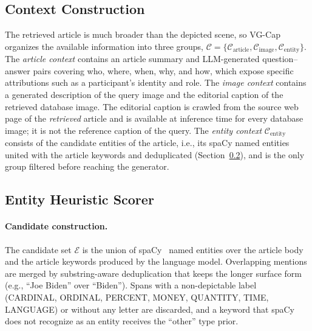 \documentclass[runningheads]{llncs}
\DeclareRobustCommand{\aciids}[1]{{\color{olive}#1}}
\DeclareRobustCommand{\revise}[1]{{\color{olive}#1}}
\DeclareRobustCommand{\aciids}[1]{#1}
\DeclareRobustCommand{\revise}[1]{#1}
\begin{document}
\subsection{Context Construction}
\label{sec:context}

The retrieved article is much broader than the depicted scene, so VG-Cap organizes the available information into three groups, $\mathcal{C}=\{\mathcal{C}_{\mathrm{article}},\mathcal{C}_{\mathrm{image}},\mathcal{C}_{\mathrm{entity}}\}$. The \emph{article context} contains an article summary and LLM-generated question--answer pairs \aciids{covering who, where, when, why, and how}, which expose specific attributions such as a participant's identity and role. The \emph{image context} contains a \aciids{generated} description of the query image and the editorial caption of the retrieved database image. \revise{The editorial caption is crawled from the source web page of the \emph{retrieved} article and is available at inference time for every database image; it is not the reference caption of the query.} The \emph{entity context} $\mathcal{C}_{\mathrm{entity}}$ consists of \aciids{the candidate entities of the article, i.e., its spaCy named entities united with the article keywords and deduplicated (Section~\ref{sec:entity_scorer}),} and is the only group filtered before reaching the generator.

\subsection{Entity Heuristic Scorer}
\label{sec:entity_scorer}

\paragraph{Candidate construction.}
The candidate set $\mathcal{E}$ is the union of spaCy~\cite{honnibal2020spacy} named entities over the article body and \aciids{the article keywords} produced by the language model. Overlapping mentions are merged by substring-aware deduplication that keeps the longer surface form (e.g., ``Joe Biden'' over ``Biden''). \revise{Spans with a non-depictable label (CARDINAL, ORDINAL, PERCENT, MONEY, QUANTITY, TIME, LANGUAGE) or without any letter are discarded, and a keyword that spaCy does not recognize as an entity receives the ``other'' type prior.}
\end{document}
